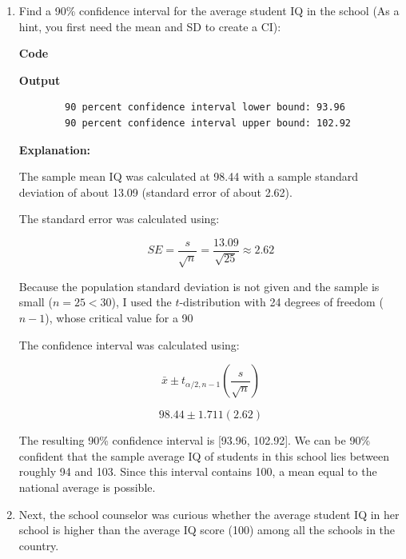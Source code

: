 \documentclass[12pt,letterpaper]{article}
\begin{document}
\begin{enumerate}

    \item Find a 90\% confidence interval for the average student IQ in the school (As a hint, you first need the mean and SD to create a CI):\\

	\vspace{1cm}

	\textbf{Code}
	

	\textbf{Output}
	\begin{verbatim}
		90 percent confidence interval lower bound: 93.96 
		90 percent confidence interval upper bound: 102.92 
	\end{verbatim}

\textbf{Explanation:}

	The sample mean IQ was calculated at 98.44 with a sample standard deviation of about 13.09 (standard error of about 2.62).

	The standard error was calculated using:

	\[ SE = \frac{s}{\sqrt{n}} = \frac{13.09}{\sqrt{25}} \approx 2.62\]

	Because the population standard deviation is not given and the sample is small ($n = 25 < 30$), I used the $t$-distribution with 24 degrees of freedom ($n-1$), whose critical value for a 90%

	The confidence interval was calculated using:

	\[ \bar{x} \pm t_{\alpha/2,n-1}\left(\frac{s}{\sqrt{n}}\right)\]

	\[ 98.44 \pm 1.711(2.62) \]

	The resulting 90\% confidence interval is [93.96, 102.92]. We can be 90\% confident that the sample average IQ of students in this school lies between roughly 94 and 103. Since this interval contains 100, a mean equal to the national average is possible.

\vspace{2cm}


    \item Next, the school counselor was curious  whether  the average student IQ in her school is higher than the average IQ score (100) among all the schools in the country.\\


\end{enumerate}
\end{document}
